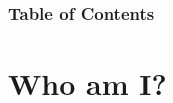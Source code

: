 \newcommand\ballref[1]{%
\tikz \node[circle, shade,ball color=structure.fg,inner sep=0pt,%
  text width=8pt,font=\tiny,align=center] {\color{white}\ref{#1}};
}



\frame{\maketitle}

\begin{frame}
  \frametitle{Table of Contents}

  \tableofcontents
\end{frame}

\section{Who am I?}
